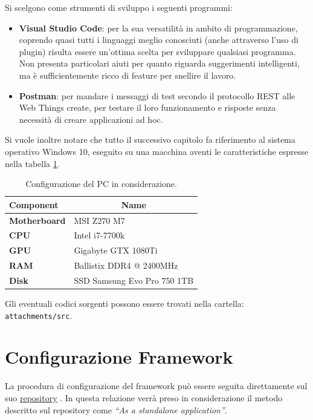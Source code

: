 \documentclass[12pt,a4paper,openright,oneside]{report}
\newcommand{\quotes}[1]{``#1''}
\begin{document}
Si scelgono come strumenti di sviluppo i seguenti programmi:

\begin{itemize}
	\item \textbf{Visual Studio Code}: per la sua versatilità in ambito di programmazione, coprendo quasi tutti i linguaggi meglio conosciuti (anche attraverso l'uso di plugin) risulta essere un'ottima scelta per sviluppare qualsiasi programma. Non presenta particolari aiuti per quanto riguarda suggerimenti intelligenti, ma è sufficientemente ricco di feature per snellire il lavoro.
	
	\item \textbf{Postman}: per mandare i messaggi di test secondo il protocollo REST alle Web Things create, per testare il loro funzionamento e risposte senza necessità di creare applicazioni ad hoc.
\end{itemize}

Si vuole inoltre notare che tutto il successivo capitolo fa riferimento al sistema operativo Windows 10, eseguito su una macchina aventi le caratteristiche espresse nella tabella \ref{tab:pc-spec}.\\

\begin{table}[h]
	\centering
	\begin{tabular}{|l|l|}
		\hline
		\textbf{Component}   & \multicolumn{1}{c|}{\textbf{Name}} \\ \hline
		\textbf{Motherboard} & MSI Z270 M7                        \\ \hline
		\textbf{CPU}         & Intel i7-7700k                     \\ \hline
		\textbf{GPU}         & Gigabyte GTX 1080Ti                \\ \hline
		\textbf{RAM}         & Ballistix DDR4 @ 2400MHz           \\ \hline
		\textbf{Disk}        & SSD Samsung Evo Pro 750 1TB                \\ \hline
	\end{tabular}
	\caption{\label{tab:pc-spec} Configurazione del PC in considerazione.}
\end{table}
Gli eventuali codici sorgenti possono essere trovati nella cartella:\\ \texttt{attachments/src}.

\clearpage


\section{Configurazione Framework}
La procedura di configurazione del framework può essere seguita direttamente sul suo \href{https://github.com/eclipse/thingweb.node-wot/}{repository} \cite{thingweb}. In questa relazione verrà preso in considerazione il metodo descritto sul repository come \textit{\quotes{As a standalone application}}.
\end{document}
